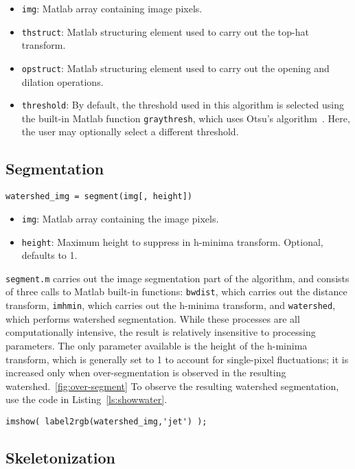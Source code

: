 \begin{itemize}
\item \texttt{img}: Matlab array containing image pixels.
\item \texttt{thstruct}: Matlab structuring element used to carry out the top-hat transform.
\item \texttt{opstruct}: Matlab structuring element used to carry out the opening and dilation operations.
\item \texttt{threshold}: By default, the threshold used in this algorithm is selected using the built-in
Matlab function \texttt{graythresh}, which uses Otsu's algorithm~\cite{?}. Here, the user may optionally
select a different threshold.
\end{itemize}

\subsection{Segmentation}

\texttt{watershed\_img = segment(img[, height])}

\begin{itemize}
\item \texttt{img}: Matlab array containing the image pixels.
\item \texttt{height}: Maximum height to suppress in h-minima transform. Optional, defaults to 1.
\end{itemize}

\texttt{segment.m} carries out the image segmentation part of the algorithm, and consists of three calls to
Matlab built-in functions: \texttt{bwdist}, which carries out the distance transform, 
\texttt{imhmin}, which carries out the h-minima transform, and \texttt{watershed}, which performs watershed
segmentation. While these processes are all computationally intensive, the result is relatively insensitive to
processing parameters. The only parameter available is the height of the h-minima transform, which is generally
set to 1 to account for single-pixel fluctuations; 
it is increased only when over-segmentation is observed in the resulting watershed.~\ref{fig:over-segment}
To observe the resulting watershed segmentation, use the code in Listing~\ref{ls:showwater}.

\begin{lstlisting}[label=ls:showwater,caption=Observe watershed segmentation]
imshow( label2rgb(watershed_img,'jet') );
\end{lstlisting}

\subsection{Skeletonization}

